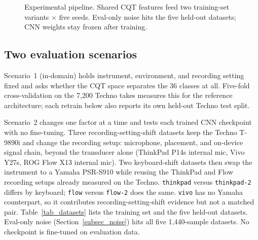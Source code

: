 \documentclass[pdflatex,sn-mathphys-num,iicol]{sn-jnl}
\begin{document}
\begin{figure}[t]
{%
  }
  \caption{Experimental pipeline. Shared CQT features feed two training-set variants $\times$ five seeds. Eval-only noise hits the five held-out datasets; CNN weights stay frozen after training.}
  \label{fig_methodology}
\end{figure}

\subsection{Two evaluation scenarios}\label{subsec_scenarios}

Scenario~1 (in-domain) holds instrument, environment, and recording setting fixed and asks whether the CQT space separates the 36 classes at all. Five-fold cross-validation on the 7{,}200 Techno takes measures this for the reference architecture; each retrain below also reports its own held-out Techno test split.

Scenario~2 changes one factor at a time and tests each trained CNN checkpoint with no fine-tuning. Three recording-setting-shift datasets keep the Techno T-9890i and change the recording setup: microphone, placement, and on-device signal chain, beyond the transducer alone (ThinkPad P14s internal mic, Vivo Y27s, ROG Flow X13 internal mic). Two keyboard-shift datasets then swap the instrument to a Yamaha PSR-S910 while reusing the ThinkPad and Flow recording setups already measured on the Techno. \texttt{thinkpad} versus \texttt{thinkpad-2} differs by keyboard; \texttt{flow} versus \texttt{flow-2} does the same. \texttt{vivo} has no Yamaha counterpart, so it contributes recording-setting-shift evidence but not a matched pair. Table~\ref{tab_datasets} lists the training set and the five held-out datasets. Eval-only noise (Section~\ref{subsec_noise}) hits all five 1{,}440-sample datasets. No checkpoint is fine-tuned on evaluation data.
\end{document}
